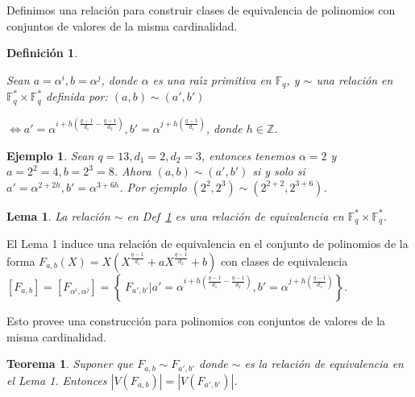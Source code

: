 \documentclass[landscape,final,paperwidth=24in,paperheight=36in]{baposter}
\newtheorem*{ejemplo*}{Ejemplo}
\newtheorem{definicion}{Definici\'on}
\newtheorem{lema}{Lema}
\newtheorem{teorema}{Teorema}
\begin{document}
\begin{poster}
{Definimos una relaci\'on para construir clases de equivalencia de polinomios con conjuntos de valores de la misma cardinalidad.


\begin{definicion}\label{relaci\'on}

  Sean $a = \alpha^i, b = \alpha^j$, donde $\alpha$ es una ra\'{\i}z primitiva en $\mathbb{F}_q$, y $\sim$ una relaci\'on en $\mathbb{F}_q^* \times \mathbb{F}_q^*$ definida por: $(a,b) \sim (a', b')$ 

  $\Longleftrightarrow a' = \alpha^{i+h(\frac{q-1}{d_1} - \frac{q-1}{d_2})}, b' = \alpha^{j+h(\frac{q-1}{d_1})}$, donde $h \in \mathbb{Z}$.

\end{definicion}

  \begin{ejemplo*}
    Sean $q = 13, d_1 = 2, d_2 = 3$, entonces tenemos $\alpha = 2$ y $a = 2^2 = 4, b = 2^3 = 8$. Ahora $(a,b) \sim (a',b')$ si y solo si
    $a' = \alpha^{2+2h}, b' = \alpha^{3+6h}$. Por ejemplo $(2^2,2^3) \sim (2^{2+2},2^{3+6})$.
  \end{ejemplo*}

\begin{lema}
  
  La relaci\'on $\sim$ en Def~\ref{relaci\'on} es una relaci\'on de equivalencia en $\mathbb{F}_q^* \times \mathbb{F}_q^*$.

\end{lema}

  El Lema 1 induce una relaci\'on de equivalencia en el conjunto de polinomios de la forma $F_{a,b}(X) = X(X^{\frac{q-1}{d_1}} + aX^{\frac{q-1}{d_2}} +b)$ con clases de equivalencia $[F_{a,b}] = [F_{\alpha^i, \alpha^j}] = \left\{\ F_{a',b'} | a' = \alpha^{i+h(\frac{q-1}{d_1} - \frac{q-1}{d_2})}, b' = \alpha^{j+h(\frac{q-1}{d_1})} \right\}$.

  Esto provee una construcci\'{o}n para polinomios con conjuntos de valores de la misma cardinalidad.
\begin{teorema}
  
  Suponer que $F_{a,b} \sim F_{a',b'}$ donde $\sim$ es la relaci\'on de equivalencia en el Lema 1. Entonces $|V(F_{a,b})| = |V(F_{a',b'})|$.

\end{teorema}
   

 }\label{valuesets}






\end{poster}
\end{document}
